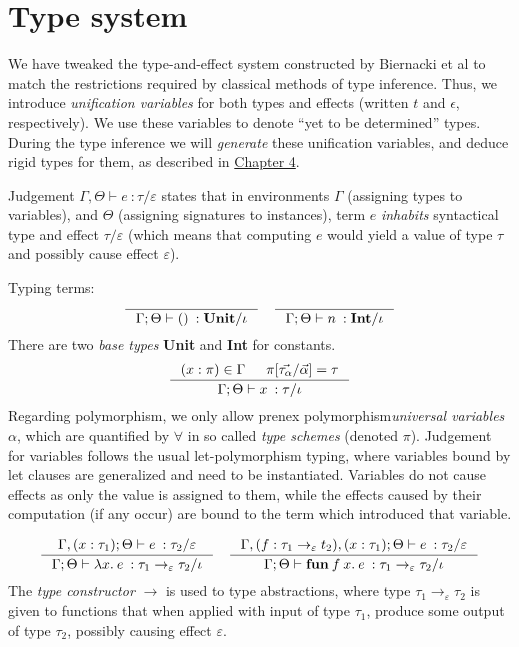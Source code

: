 \documentclass[declaration,shortabstract]{iithesis}
\newcommand{\types}[4][\Gamma;\Theta]{\ensuremath{{{#1} \vdash {#2} \: : {#3}/{#4}}}}
\newcommand{\arrow}[3]{{#1}\rightarrow_{#2}{#3}}
\newcommand{\lam}[1][x]{\ensuremath{\lambda #1.\:}}
\begin{document}
\chapter{Type system}
We have tweaked the type-and-effect system constructed by Biernacki et al\cite{binders-labels}
to match the restrictions required by classical methods of type inference.
Thus, we introduce \textit{unification variables} for both types and effects
(written $t$ and $\epsilon$, respectively).
We use these variables to denote ``yet to be determined'' types.
During the type inference we will \textit{generate} these unification variables,
and deduce rigid types for them, as described in \hyperlink{chapter.4}{Chapter 4}.

Judgement $\types[\Gamma, \Theta]{e}{\tau}{\varepsilon}$ states that in environments $\Gamma$ (assigning types to variables),
and $\Theta$ (assigning signatures to instances), term $e$ \textit{inhabits} syntactical type and effect $\tau / \varepsilon$ (which means that computing $e$ would yield a value of type $\tau$ and possibly cause effect $\varepsilon$).

Typing terms:
$$
\inference{}{\types{()}{\textbf{Unit}}{\iota}}
\quad
\inference{}{\types{n}{\textbf{Int}}{\iota}}{}
$$
\setlength{\jot}{10pt}
There are two \textit{base types} \textbf{Unit} and \textbf{Int} for constants.
$$
\inference{(x : \pi) \in \Gamma & \pi[\vec{\tau_\alpha} / \vec{\alpha}] = \tau}{\types{x}{\tau}{\iota}}
$$
Regarding polymorphism, we only allow prenex polymorphism\textit{universal variables} $\alpha$, which are quantified by $\forall$ in 
so called \textit{type schemes} (denoted $\pi$).
Judgement for variables follows the usual let-polymorphism typing, 
where variables bound by let clauses are generalized and need to be instantiated.
Variables do not cause effects as only the value is assigned to them,
while the effects caused by their computation (if any occur)
are bound to the term which introduced that variable.

$$
\inference{
    \types[\Gamma,(x : \tau_1); \Theta]{e}{\tau_2}{\varepsilon} 
}{
    \types{\lam e}{\arrow{\tau_1}{\varepsilon}{\tau_2}}{\iota}
}
\quad
\inference{
    \types[\Gamma, (f : \arrow{\tau_1}{\varepsilon}{t_2}),(x : \tau_1); \Theta]{e}{\tau_2}{\varepsilon} 
}{
    \types{\textbf{fun}\:f\:x.\: e}{\arrow{\tau_1}{\varepsilon}{\tau_2}}{\iota}
}
$$
The \textit{type constructor} $\rightarrow$ is used to type abstractions,
where type $\arrow{\tau_1}{\varepsilon}{\tau_2}$ is given to functions
that when applied with input of type $\tau_1$, produce some output of type $\tau_2$,
possibly causing effect $\varepsilon$.
\end{document}
